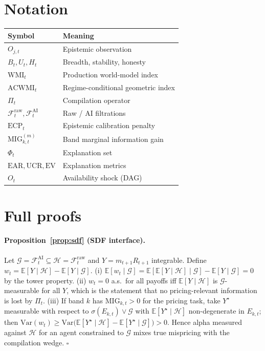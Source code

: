 \documentclass[12pt]{article}
\begin{document}
\appendix
\section{Notation}
\label{app:notation}
\begin{center}
\begin{tabular}{ll}
\toprule
Symbol & Meaning \\
\midrule
$O_{j,t}$ & Epistemic observation \\
$B_t,U_t,H_t$ & Breadth, stability, honesty \\
$\mathrm{WMI}_t$ & Production world-model index \\
$\mathrm{ACWMI}_t$ & Regime-conditional geometric index \\
$\Pi_t$ & Compilation operator \\
$\mathcal{F}^{\mathrm{raw}}_t,\mathcal{F}^{\mathrm{AI}}_t$ & Raw / AI filtrations \\
$\mathrm{ECP}_t$ & Epistemic calibration penalty \\
$\mathrm{MIG}^{(m)}_{k,t}$ & Band marginal information gain \\
$\Phi_t$ & Explanation set \\
$\mathrm{EAR},\mathrm{UCR},\mathrm{EV}$ & Explanation metrics \\
$O_t$ & Availability shock (DAG) \\
\bottomrule
\end{tabular}
\end{center}

\section{Full proofs}
\label{app:proofs}

\paragraph{Proposition~\ref{prop:sdf} (SDF interface).}
Let $\mathcal{G}=\mathcal{F}^{\mathrm{AI}}_t\subseteq\mathcal{H}=\mathcal{F}^{\mathrm{raw}}_t$ and $Y=m_{t+1}R_{t+1}$ integrable. Define $w_t=\mathbb{E}[Y\mid\mathcal{H}]-\mathbb{E}[Y\mid\mathcal{G}]$. (i) $\mathbb{E}[w_t\mid\mathcal{G}]=\mathbb{E}[\mathbb{E}[Y\mid\mathcal{H}]\mid\mathcal{G}]-\mathbb{E}[Y\mid\mathcal{G}]=0$ by the tower property. (ii) $w_t=0$ a.s.\ for all payoffs iff $\mathbb{E}[Y\mid\mathcal{H}]$ is $\mathcal{G}$-measurable for all $Y$, which is the statement that no pricing-relevant information is lost by $\Pi_t$. (iii) If band $k$ has $\mathrm{MIG}_{k,t}>0$ for the pricing task, take $Y^\star$ measurable with respect to $\sigma(E_{k,t})\vee\mathcal{G}$ with $\mathbb{E}[Y^\star\mid\mathcal{H}]$ non-degenerate in $E_{k,t}$; then $\mathrm{Var}(w_t)\ge\mathrm{Var}\bigl(\mathbb{E}[Y^\star\mid\mathcal{H}]-\mathbb{E}[Y^\star\mid\mathcal{G}]\bigr)>0$. Hence alpha measured against $\mathcal{H}$ for an agent constrained to $\mathcal{G}$ mixes true mispricing with the compilation wedge. \hfill$\square$
\end{document}
